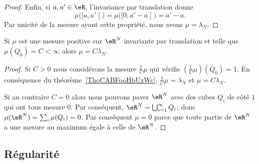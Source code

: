 \begin{proof}
																																								Enfin, si \( a,a'\in \eR\), l'invariance par translation donne
																																								\begin{equation}
																																								\mu\big( \mathopen[ a , a' \mathclose[ \big)=\mu\big( \mathopen[ 0 , a'-a \mathclose[ \big)=a'-a.
																																								\end{equation}
																																								Par unicité de la mesure ayant cette propriété, nous avons \( \mu=\lambda_N\).
																																								\end{proof}

																																								\begin{corollary}       \label{CorKGMRooHWOQGP}
																																								Si \( \mu\) est une mesure positive sur \( \eR^N\) invariante par translation et telle que \( \mu(Q_0)=C<\infty\) alors \( \mu=C\lambda_N\).
																																								\end{corollary}

																																								\begin{proof}
																																								Si \( C>0\) nous considérons la mesure \( \frac{1}{ C }\mu\) qui vérifie \( (\frac{1}{ C }\mu)(Q_0)=1\). En conséquence du théorème~\ref{ThoCABFooHbUzWc}, \( \frac{1}{ C }\mu=\lambda_N\) et \( \mu=C\lambda_N\).

																																								Si au contraire \( C=0\) alors nous pouvons paver \( \eR^N\) avec des cubes \( Q_i\) de côté \( 1\) qui ont tous mesure \( 0\). Par conséquent, \( \eR^N=\bigcup_{i=1}^{\infty}Q_i\), donc \( \mu(\eR^N)=\sum_i\mu(Q_i)=0\). Par conséquent \( \mu=0\) parce que toute partie de \( \eR^N\) a une mesure au maximum égale à celle de \( \eR^N\).
																																								\end{proof}

																																								\subsection{Régularité}

